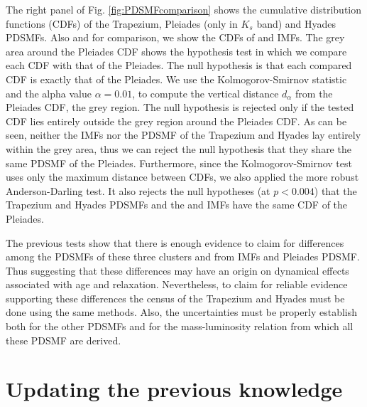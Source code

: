 The right panel of Fig. \ref{fig:PDSMFcomparison} shows the cumulative distribution functions (CDFs) of  the Trapezium, Pleiades (only in $K_s$ band) and Hyades PDSMFs. Also and for comparison,  we show the CDFs of \citet{Chabrier2005} and \citet{Thies2007} IMFs. The grey area around the Pleiades CDF shows the hypothesis test in which we compare each CDF with that of the Pleiades. The null hypothesis is that each compared CDF is exactly that of the Pleiades. We use the Kolmogorov-Smirnov statistic and the alpha value $\alpha = 0.01$, to compute the vertical distance $d_{\alpha}$ from the Pleiades CDF, the grey region. The null hypothesis is rejected only if the tested CDF lies entirely outside the grey region around the Pleiades CDF. As can be seen, neither the IMFs nor the PDSMF of the Trapezium and Hyades lay entirely within the grey area, thus we can reject the null hypothesis that they share the same PDSMF of the Pleiades. Furthermore, since the Kolmogorov-Smirnov test uses only the maximum distance between CDFs, we also applied the more robust Anderson-Darling test. It also rejects the null hypotheses (at $p < 0.004$) that the Trapezium and Hyades PDSMFs and the \citet{Chabrier2005} and \citet{Thies2007} IMFs have the same CDF of the Pleiades. 

The previous tests show that there is enough evidence to claim for differences among the PDSMFs of these three clusters and from IMFs and Pleiades PDSMF. Thus suggesting that these differences may have an origin on dynamical effects associated with age and relaxation. Nevertheless, to claim for reliable evidence supporting these differences the census of the Trapezium and Hyades must be done using the same methods. Also, the uncertainties must be properly establish both for the other PDSMFs and for the mass-luminosity relation from which all these PDSMF are derived. 

\section{Updating the previous knowledge}
